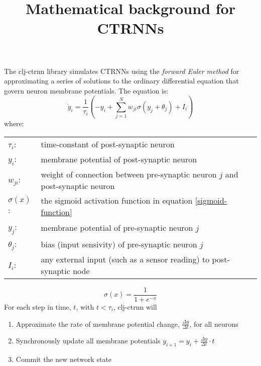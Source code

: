 \documentclass[]{article}
\title{Mathematical background for CTRNNs}
\begin{document}
\begin{acronym}
\end{acronym}

The clj-ctrnn library simulates \acs{CTRNN}s using the \textit{forward Euler method} for approximating a series of solutions to the ordinary differential equation that govern neuron membrane potentials. The equation is:
\begin{equation}
  \dot{y}_i = \frac{1}{\tau_i}(-y_i + \sum_{j=1}^{N}w_{ji}\sigma(y_j + \theta_j) + I_i)
\end{equation}
where:\\
\begin{tabular}{ll}
  $\tau_i$: & time-constant of post-synaptic neuron\\
  $y_i$: & membrane potential of post-synaptic neuron\\
  $w_{ji}$: & weight of connection between pre-synaptic neuron $j$ and post-synaptic neuron\\
  $\sigma(x)$: & the sigmoid activation function in equation \ref{sigmoid-function}\\
  $y_j$: & membrane potential of pre-synaptic neuron $j$\\
  $\theta_j$: & bias (input sensivity) of pre-synaptic neuron $j$\\
  $I_i$: & any external input (such as a sensor reading) to post-synaptic node\\
\end{tabular}
\begin{equation}
  \label{sigmoid-function}
  \sigma(x) = \frac{1}{1 + e^{-x}}
\end{equation}
For each step in time, $t$, with $t<\tau_i$, clj-ctrnn will
\begin{enumerate}
\item Approximate the rate of membrane potential change, $\frac{\Delta y}{\Delta t}$, for all neurons
\item Synchronously update all membrane potentials $y_{i+1} = y_i + \frac{\Delta y}{\Delta t} \cdot t$
\item Commit the new network state
\end{enumerate}
\end{document}
